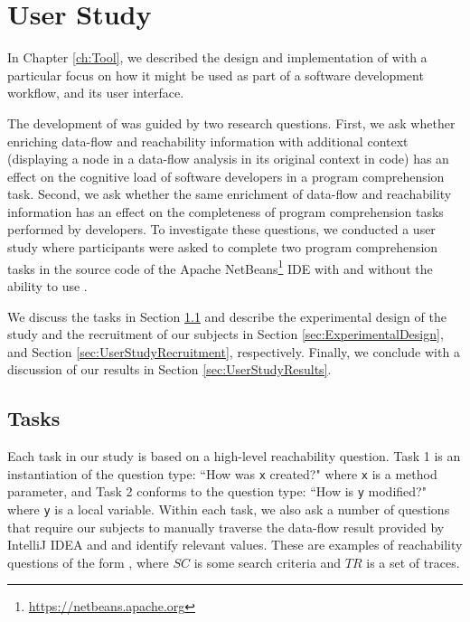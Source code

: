 
\newcommand{\cardamount}{40}

\chapter{User Study}
\label{ch:UserStudy}

In Chapter \ref{ch:Tool}, we described the design and implementation of
\toolname{} with a particular focus on how it might be used as part of a
software development workflow, and its user interface.
\par The development of \toolname{} was guided by two research questions.
First, we ask whether enriching data-flow and reachability information with 
additional context (\eg displaying a node in a data-flow analysis in its 
original context in code) has an effect on the cognitive load of software 
developers in a program comprehension task.
Second, we ask whether the same enrichment of data-flow and reachability
information has an effect on the completeness of program comprehension tasks
performed by developers.
To investigate these questions, we conducted a user study where participants 
were asked to complete two program comprehension tasks in the source code of 
the Apache NetBeans\footnote{\url{https://netbeans.apache.org}} \ac{IDE} with 
and without the ability to use \toolname{}.
\par We discuss the tasks in Section \ref{sec:Tasks} and describe the 
experimental design of the study and the recruitment of our subjects in Section
\ref{sec:ExperimentalDesign}, and Section \ref{sec:UserStudyRecruitment}, 
respectively.
Finally, we conclude with a discussion of our results in Section
\ref{sec:UserStudyResults}.


\section{Tasks}
\label{sec:Tasks}

Each task in our study is based on a high-level reachability question. 
Task 1 is an instantiation of the question type: ``How was \texttt{x} created?"
where \texttt{x} is a method parameter, and Task 2 conforms to the question
type: ``How is \texttt{y} modified?" where \texttt{y} is a local variable.
Within each task, we also ask a number of questions that require our subjects
to manually traverse the data-flow result provided by IntelliJ IDEA and
\toolname{} and identify relevant values.
These are examples of reachability questions of the form \findq{}, where
$SC$ is some search criteria and $TR$ is a set of traces.

